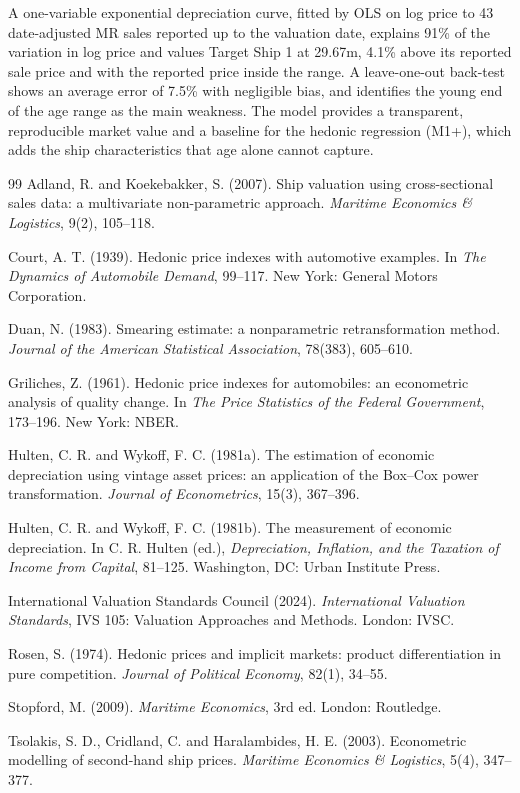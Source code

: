 \documentclass[11pt,a4paper]{article}
\newcommand{\usd}[1]{\text{US\$}#1}
\begin{document}
A one-variable exponential depreciation curve, fitted by OLS on log price to 43 date-adjusted MR sales reported up to the valuation date, explains 91\% of the variation in log price and values Target Ship 1 at \usd{29.67}m, 4.1\% above its reported sale price and with the reported price inside the range. A leave-one-out back-test shows an average error of 7.5\% with negligible bias, and identifies the young end of the age range as the main weakness. The model provides a transparent, reproducible market value and a baseline for the hedonic regression (M1+), which adds the ship characteristics that age alone cannot capture.

\begin{thebibliography}{99}
Adland, R. and Koekebakker, S. (2007). Ship valuation using cross-sectional sales data: a multivariate non-parametric approach. \emph{Maritime Economics \& Logistics}, 9(2), 105--118.

Court, A. T. (1939). Hedonic price indexes with automotive examples. In \emph{The Dynamics of Automobile Demand}, 99--117. New York: General Motors Corporation.

Duan, N. (1983). Smearing estimate: a nonparametric retransformation method. \emph{Journal of the American Statistical Association}, 78(383), 605--610.

Griliches, Z. (1961). Hedonic price indexes for automobiles: an econometric analysis of quality change. In \emph{The Price Statistics of the Federal Government}, 173--196. New York: NBER.

Hulten, C. R. and Wykoff, F. C. (1981a). The estimation of economic depreciation using vintage asset prices: an application of the Box--Cox power transformation. \emph{Journal of Econometrics}, 15(3), 367--396.

Hulten, C. R. and Wykoff, F. C. (1981b). The measurement of economic depreciation. In C. R. Hulten (ed.), \emph{Depreciation, Inflation, and the Taxation of Income from Capital}, 81--125. Washington, DC: Urban Institute Press.

International Valuation Standards Council (2024). \emph{International Valuation Standards}, IVS 105: Valuation Approaches and Methods. London: IVSC.

Rosen, S. (1974). Hedonic prices and implicit markets: product differentiation in pure competition. \emph{Journal of Political Economy}, 82(1), 34--55.

Stopford, M. (2009). \emph{Maritime Economics}, 3rd ed. London: Routledge.

Tsolakis, S. D., Cridland, C. and Haralambides, H. E. (2003). Econometric modelling of second-hand ship prices. \emph{Maritime Economics \& Logistics}, 5(4), 347--377.
\end{thebibliography}
\end{document}

